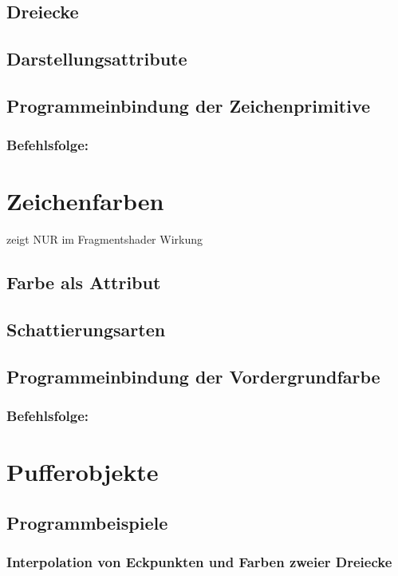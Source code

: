 \documentclass{scrreprt}
\begin{document}
\subsection{Dreiecke}

\subsection{Darstellungsattribute}

\subsection{Programmeinbindung der Zeichenprimitive}
\subsubsection*{Befehlsfolge:}

\section{Zeichenfarben}
zeigt NUR im Fragmentshader Wirkung
\subsection{Farbe als Attribut}
\subsection{Schattierungsarten}
\subsection{Programmeinbindung der Vordergrundfarbe}
\subsubsection*{Befehlsfolge:}

\section{Pufferobjekte}
\subsection{Programmbeispiele}
\subsubsection*{Interpolation von Eckpunkten und Farben zweier Dreiecke}
\end{document}
